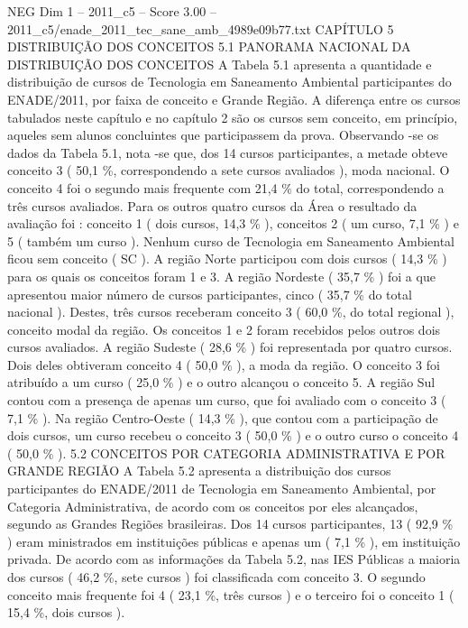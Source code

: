 \begin{textsample}{NEG Dim 1 – 2011\_c5 – Score 3.00 – 2011\_c5/enade\_2011\_tec\_sane\_amb\_4989e09b77.txt}  \label{ex:f1_neg_311}
CAPÍTULO 5 DISTRIBUIÇÃO DOS CONCEITOS 5.1 PANORAMA NACIONAL DA DISTRIBUIÇÃO DOS CONCEITOS A Tabela 5.1 apresenta a quantidade e distribuição de cursos de Tecnologia em Saneamento Ambiental participantes do ENADE/2011, por faixa de conceito e Grande Região.
A diferença entre os cursos tabulados neste capítulo e no capítulo 2 são os cursos sem conceito, em princípio, aqueles sem alunos concluintes que participassem da prova.
Observando -se os dados da Tabela 5.1, nota -se que, dos 14 cursos participantes, a metade obteve conceito 3 ( 50,1 \%, correspondendo a sete cursos avaliados ), moda nacional.
O conceito 4 foi o segundo mais frequente com 21,4 \% do total, correspondendo a três cursos avaliados.
Para os outros quatro cursos da Área o resultado da avaliação foi : conceito 1 ( dois cursos, 14,3 \% ), conceitos 2 ( um curso, 7,1 \% ) e 5 ( também um curso ).
Nenhum curso de Tecnologia em Saneamento Ambiental ficou sem conceito ( SC ).
A região Norte participou com dois cursos ( 14,3 \% ) para os quais os conceitos foram 1 e 3.
A região Nordeste ( 35,7 \% ) foi a que apresentou maior número de cursos participantes, cinco ( 35,7 \% do total nacional ).
Destes, três cursos receberam conceito 3 ( 60,0 \%, do total regional ), conceito modal da região.
Os conceitos 1 e 2 foram recebidos pelos outros dois cursos avaliados.
A região Sudeste ( 28,6 \% ) foi representada por quatro cursos.
Dois deles obtiveram conceito 4 ( 50,0 \% ), a moda da região.
O conceito 3 foi atribuído a um curso ( 25,0 \% ) e o outro alcançou o conceito 5.
A região Sul contou com a presença de apenas um curso, que foi avaliado com o conceito 3 ( 7,1 \% ).
Na região Centro-Oeste ( 14,3 \% ), que contou com a participação de dois cursos, um curso recebeu o conceito 3 ( 50,0 \% ) e o outro curso o conceito 4 ( 50,0 \% ). 5.2 CONCEITOS POR CATEGORIA ADMINISTRATIVA E POR GRANDE REGIÃO A Tabela 5.2 apresenta a distribuição dos cursos participantes do ENADE/2011 de Tecnologia em Saneamento Ambiental, por Categoria Administrativa, de acordo com os conceitos por eles alcançados, segundo as Grandes Regiões brasileiras.
Dos 14 cursos participantes, 13 ( 92,9 \% ) eram ministrados em instituições públicas e apenas um ( 7,1 \% ), em instituição privada.
De acordo com as informações da Tabela 5.2, nas IES Públicas a maioria dos cursos ( 46,2 \%, sete cursos ) foi classificada com conceito 3.
O segundo conceito mais frequente foi 4 ( 23,1 \%, três cursos ) e o terceiro foi o conceito 1 ( 15,4 \%, dois cursos ).

\end{textsample}
